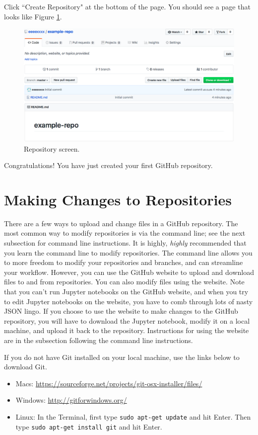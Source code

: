 \documentclass[11pt,a4paper]{article}
\begin{document}
Click ``Create Repository" at the bottom of the page.
You should see a page that looks like Figure \ref{fig:repo-screen}.

\begin{figure}[h]
\centering
\includegraphics[width=.7\textwidth]{figures/repo_screen.png}
\caption{Repository screen.}
\label{fig:repo-screen}
\end{figure}

Congratulations!
You have just created your first GitHub repository.

\section*{Making Changes to Repositories}
There are a few ways to upload and change files in a GitHub repository.
The most common way to modify repositories is via the command line; see the next subsection for command line instructions.
It is highly, \textit{highly} recommended that you learn the command line to modify repositories.
The command line allows you to more freedom to modify your repositories and branches, and can streamline your workflow.
However, you can use the GitHub website to upload and download files to and from repositories.
You can also modify files using the website.
Note that you can't run Jupyter notebooks on the GitHub website, and when you try to edit Jupyter notebooks on the website, you have to comb through lots of nasty JSON lingo.
If you choose to use the website to make changes to the GitHub repository, you will have to download the Jupyter notebook, modify it on a local machine, and upload it back to the repository.
Instructions for using the website are in the subsection following the command line instructions.

If you do not have Git installed on your local machine, use the links below to download Git.
\begin{itemize}
\item[] Macs: \url{https://sourceforge.net/projects/git-osx-installer/files/}
\item[] Windows: \url{http://gitforwindows.org/}
\item[] Linux: In the Terminal, first type \texttt{sudo apt-get update} and hit Enter. Then type \texttt{sudo apt-get install git} and hit Enter.
\end{itemize} 
\end{document}
